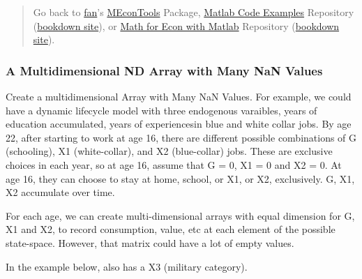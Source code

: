 \documentclass[
]{book}
\begin{document}
\begin{quote}
Go back to \href{http://fanwangecon.github.io/}{fan}'s \href{https://fanwangecon.github.io/MEconTools/}{MEconTools} Package, \href{https://fanwangecon.github.io/M4Econ/}{Matlab Code Examples} Repository (\href{https://fanwangecon.github.io/M4Econ/bookdown}{bookdown site}), or \href{https://fanwangecon.github.io/Math4Econ/}{Math for Econ with Matlab} Repository (\href{https://fanwangecon.github.io/Math4Econ/bookdown}{bookdown site}).
\end{quote}

\hypertarget{a-multidimensional-nd-array-with-many-nan-values}{%
\subsubsection{A Multidimensional ND Array with Many NaN Values}\label{a-multidimensional-nd-array-with-many-nan-values}}

Create a multidimensional Array with Many NaN Values. For example, we
could have a dynamic lifecycle model with three endogenous varaibles,
years of education accumulated, years of experiencesin blue and white
collar jobs. By age 22, after starting to work at age 16, there are
different possible combinations of G (schooling), X1 (white-collar), and
X2 (blue-collar) jobs. These are exclusive choices in each year, so at
age 16, assume that G = 0, X1 = 0 and X2 = 0. At age 16, they can choose
to stay at home, school, or X1, or X2, exclusively. G, X1, X2 accumulate
over time.

For each age, we can create multi-dimensional arrays with equal
dimension for G, X1 and X2, to record consumption, value, etc at each
element of the possible state-space. However, that matrix could have a
lot of empty values.

In the example below, also has a X3 (military category).
\end{document}
